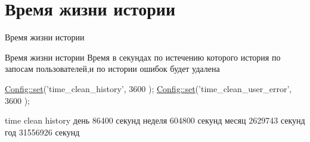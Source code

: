 \hypertarget{group__time__clean}{\section{Время жизни истории}
\label{group__time__clean}
}


Время жизни истории  


Время жизни истории Время в секундах по истечению которого история по запосам пользователей,и по истории ошибок будет удалена 
\begin{DoxyCode}
\hyperlink{class_config_aa485369b2925858d92e468d405bd0798}{Config::set}(\textcolor{stringliteral}{'time\_clean\_history'}, 3600 );
\hyperlink{class_config_aa485369b2925858d92e468d405bd0798}{Config::set}(\textcolor{stringliteral}{'time\_clean\_user\_error'}, 3600 );
\end{DoxyCode}


time clean history день 86400 секунд неделя 604800 секунд месяц 2629743 секунд год 31556926 секунд 
